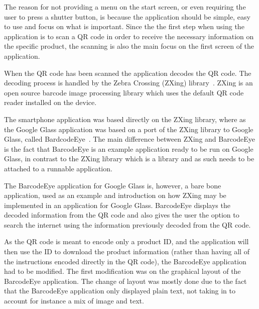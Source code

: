 The reason for not providing a menu on the start screen, or even requiring the user to press a shutter button, is because the application should be simple, easy to use and focus on what is important. Since the the first step when using the application is to scan a QR code in order to receive the necessary information on the specific product, the scanning is also the main focus on the first screen of the application.

When the QR code has been scanned the application decodes the QR code. The decoding process is handled by the Zebra Crossing (ZXing) library~\cite{zxing}. ZXing is an open source barcode image processing library which uses the default QR code reader installed on the device.

The smartphone application was based directly on the ZXing library, where as the Google Glass application was based on a port of the ZXing library to Google Glass, called BardcodeEye~\cite{barcodeEye}. The main difference between ZXing and BarcodeEye is the fact that BarcodeEye is an example application ready to be run on Google Glass, in contrast to the ZXing library which is a library and as such needs to be attached to a runnable application.

The BarcodeEye application for Google Glass is, however, a bare bone application, used as an example and introduction on how ZXing may be implemented in an application for Google Glass. BarcodeEye displays the decoded information from the QR code and also gives the user the option to search the internet using the information previously decoded from the QR code.

As the QR code is meant to encode only a product ID, and the application will then use the ID to download the product information (rather than having all of the instructions encoded directly in the QR code), the BarcodeEye application had to be modified. The first modification was on the graphical layout of the BarcodeEye application. The change of layout was mostly done due to the fact that the BarcodeEye application only displayed plain text, not taking in to account for instance a mix of image and text.

